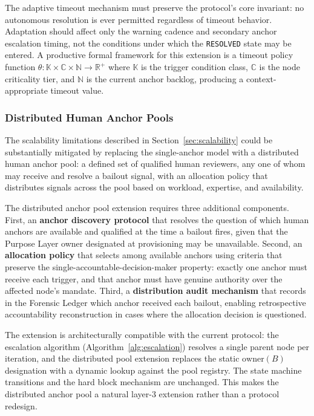 The adaptive timeout mechanism must preserve the protocol's core invariant: no autonomous resolution is ever permitted regardless of timeout behavior. Adaptation should affect only the warning cadence and secondary anchor escalation timing, not the conditions under which the \texttt{RESOLVED} state may be entered. A productive formal framework for this extension is a timeout policy function $\theta : \mathbb{K} \times \mathbb{C} \times \mathbb{N} \rightarrow \mathbb{R}^+$ where $\mathbb{K}$ is the trigger condition class, $\mathbb{C}$ is the node criticality tier, and $\mathbb{N}$ is the current anchor backlog, producing a context-appropriate timeout value.

\subsubsection{Distributed Human Anchor Pools}\label{sec:anchor-pools}

The scalability limitations described in Section~\ref{sec:scalability} could be substantially mitigated by replacing the single-anchor model with a distributed human anchor pool: a defined set of qualified human reviewers, any one of whom may receive and resolve a bailout signal, with an allocation policy that distributes signals across the pool based on workload, expertise, and availability.

The distributed anchor pool extension requires three additional components. First, an \textbf{anchor discovery protocol} that resolves the question of which human anchors are available and qualified at the time a bailout fires, given that the Purpose Layer owner designated at provisioning may be unavailable. Second, an \textbf{allocation policy} that selects among available anchors using criteria that preserve the single-accountable-decision-maker property: exactly one anchor must receive each trigger, and that anchor must have genuine authority over the affected node's mandate. Third, a \textbf{distribution audit mechanism} that records in the Forensic Ledger which anchor received each bailout, enabling retrospective accountability reconstruction in cases where the allocation decision is questioned.

The extension is architecturally compatible with the current protocol: the escalation algorithm (Algorithm~\ref{alg:escalation}) resolves a single parent node per iteration, and the distributed pool extension replaces the static $\text{owner}(B)$ designation with a dynamic lookup against the pool registry. The state machine transitions and the hard block mechanism are unchanged. This makes the distributed anchor pool a natural layer-3 extension rather than a protocol redesign.
